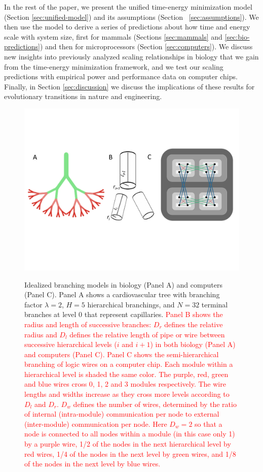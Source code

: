 \documentclass[12pt]{article}
\newcommand{\red}[1]{\textcolor{red}{#1}}
\begin{document}
In the rest of the paper, we present the unified time-energy minimization model
(Section \ref{sec:unified-model}) and its assumptions (Section ~\ref{sec:assumptions}).  We then use the model to derive a
series of predictions about how time and energy scale with system size, first
for mammals (Sections \ref{sec:mammals} and \ref{sec:bio-predictions}) and then for microprocessors (Section
\ref{sec:computers}). We discuss new insights into previously analyzed
scaling relationships in biology that we gain from the time-energy minimization
framework, and we test our scaling predictions with empirical power and performance
data on computer chips.  Finally, in Section \ref{sec:discussion}  we discuss
the implications of these results for evolutionary transitions in nature and
engineering.

\begin{figure}[!h]
\centering
\includegraphics[width=\textwidth]{Figures/Figure1Draft4.pdf}
\label{fig:firstfig}

\caption{Idealized branching models in biology (Panel A) and computers
  (Panel C). Panel A shows a cardiovascular tree with branching factor $\lambda
  = 2$, $H = 5$ hierarchical branchings, and $N = 32$ terminal
  branches at level 0 that represent capillaries. \red{Panel B shows the radius and length of successive branches: $D_r$ defines the relative radius and $D_l$ defines the relative length of pipe or wire between successive hierarchical levels ($i$ and $i+1$) in both biology (Panel A) and computers (Panel C). Panel C shows the semi-hierarchical branching of logic wires on a computer chip. Each module within a
  hierarchical level is shaded the same color. The purple, red, green and blue wires cross 0, 1, 2 and 3 modules respectively. The wire lengths and widths increase as they cross more levels according to $D_l$ and $D_r$. $D_w$ defines the number of wires, determined by the ratio of internal (intra-module) communication per
  node to external (inter-module) communication per node. Here $D_w = 2$ so that a node is connected to all nodes within a module (in this case only 1) by a purple wire, 1/2 of the nodes in the next hierarchical level by red wires, 1/4 of the nodes in the next level by green wires, and 1/8 of the nodes in the next level by blue wires.}}

\end{figure}
\end{document}
